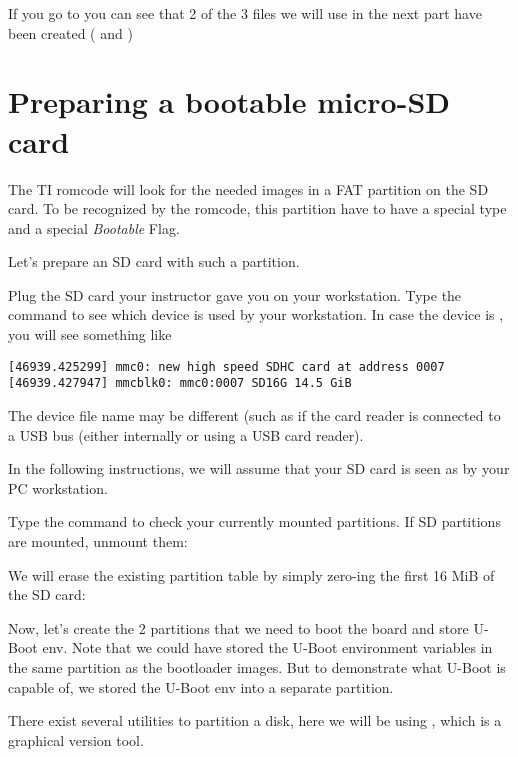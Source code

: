 If you go to 
you can see that 2 of the 3 files we will use in the next part have been created
( and )

\section{Preparing a bootable micro-SD card}\label{sec:Prepboot}

The TI romcode will look for the needed images in a FAT partition
on the SD card. To be recognized by the romcode, this partition have
to have a special type and a special {\em Bootable} Flag.

Let's prepare an SD card with such a partition.

Plug the SD card your instructor gave you on your workstation. Type
the  command to see which device is used by your
workstation. In case the device is , you will see
something like

\begin{verbatim}
[46939.425299] mmc0: new high speed SDHC card at address 0007
[46939.427947] mmcblk0: mmc0:0007 SD16G 14.5 GiB
\end{verbatim}

The device file name may be different (such as 
if the card reader is connected to a USB bus (either internally
or using a USB card reader).

In the following instructions, we will assume that your SD card is
seen as  by your PC workstation.

Type the  command to check your currently mounted
partitions. If SD partitions are mounted, unmount them:


We will erase the existing partition table by simply zero-ing the
first 16 MiB of the SD card:


Now, let's create the 2 partitions
that we need to boot the board and store U-Boot env. Note that we could have stored the
U-Boot environment variables in the same partition as the bootloader images.
But to demonstrate what U-Boot is capable of, we stored the U-Boot env
into a separate partition.

There exist several utilities to partition a disk, here we will
be using , which is a graphical version  tool.

